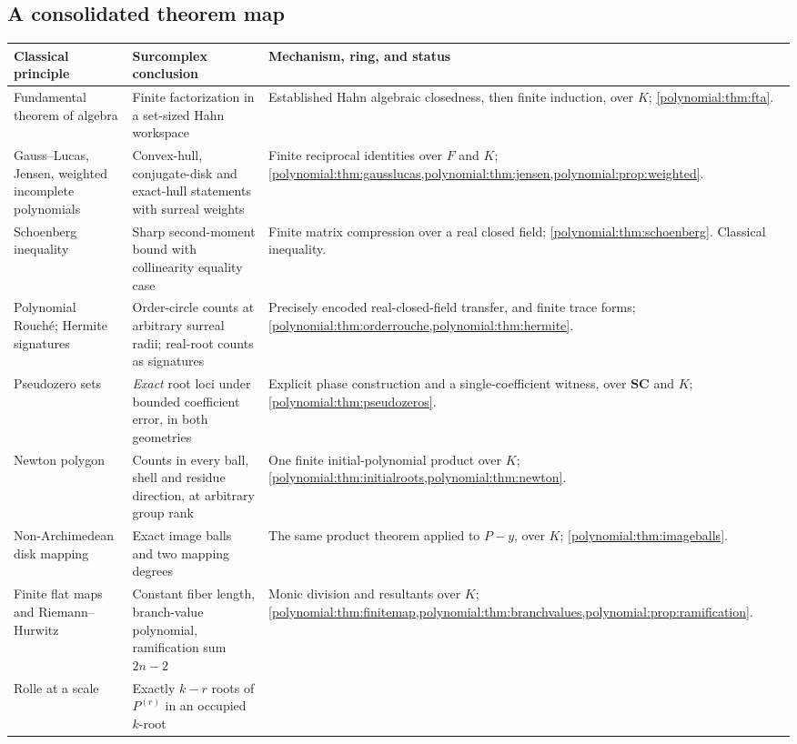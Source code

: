 \documentclass[11pt,letterpaper]{article}
\numberwithin{equation}{section}
\theoremstyle{definition}
\theoremstyle{remark}\newtheorem{remark}[theorem]{Remark}
\newcommand{\SC}{\mathbf{SC}}
\begin{document}
\subsection{A consolidated theorem map}
\begin{longtable}{@{}P{0.24\textwidth}P{0.31\textwidth}P{0.36\textwidth}@{}}
\toprule
Classical principle & Surcomplex conclusion & Mechanism, ring, and status\\
\midrule
\endhead
Fundamental theorem of algebra & Finite factorization in a set-sized Hahn
workspace & Established Hahn algebraic closedness, then finite induction, over
$K$; \cref{polynomial:thm:fta}.\\[0.4em]
Gauss--Lucas, Jensen, weighted incomplete polynomials & Convex-hull,
conjugate-disk and exact-hull statements with surreal weights & Finite
reciprocal identities over $F$ and $K$;
\cref{polynomial:thm:gausslucas,polynomial:thm:jensen,polynomial:prop:weighted}.\\[0.4em]
Schoenberg inequality & Sharp second-moment bound with collinearity equality
case & Finite matrix compression over a real closed field;
\cref{polynomial:thm:schoenberg}. Classical inequality.\\[0.4em]
Polynomial Rouch\'e; Hermite signatures & Order-circle counts at arbitrary
surreal radii; real-root counts as signatures & Precisely encoded
real-closed-field transfer, and finite trace forms;
\cref{polynomial:thm:orderrouche,polynomial:thm:hermite}.\\[0.4em]
Pseudozero sets & \emph{Exact} root loci under bounded coefficient error, in
both geometries & Explicit phase construction and a single-coefficient
witness, over $\SC$ and $K$; \cref{polynomial:thm:pseudozeros}.\\[0.4em]
Newton polygon & Counts in every ball, shell and residue direction, at
arbitrary group rank & One finite initial-polynomial product over $K$;
\cref{polynomial:thm:initialroots,polynomial:thm:newton}.\\[0.4em]
Non-Archimedean disk mapping & Exact image balls and two mapping degrees &
The same product theorem applied to $P-y$, over $K$;
\cref{polynomial:thm:imageballs}.\\[0.4em]
Finite flat maps and Riemann--Hurwitz & Constant fiber length, branch-value
polynomial, ramification sum $2n-2$ & Monic division and resultants over $K$;
\cref{polynomial:thm:finitemap,polynomial:thm:branchvalues,polynomial:prop:ramification}.\\[0.4em]
Rolle at a scale & Exactly $k-r$ roots of $P^{(r)}$ in an occupied $k$-root

\end{longtable}
\end{document}
